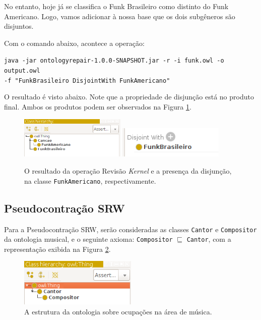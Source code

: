 No entanto, hoje já se classifica o Funk Brasileiro como distinto do Funk Americano. Logo, vamos adicionar à nossa base que os dois subgêneros são disjuntos.

Com o comando abaixo, acontece a operação:

\begin{small}
	\texttt{java -jar ontologyrepair-1.0.0-SNAPSHOT.jar -r -i funk.owl -o output.owl \\ -f "FunkBrasileiro DisjointWith FunkAmericano"}
\end{small}

O resultado é visto abaixo. Note que a propriedade de disjunção está no produto final. Ambos os produtos podem ser observados na Figura \ref{img:r2}.

\begin{figure}[H]
	\centering
	\includegraphics[width=0.45\textwidth]{Capitulos/Implementacao/r2.png}
	\includegraphics[width=0.45\textwidth]{Capitulos/Implementacao/r3.png}
	\caption{O resultado da operação Revisão \textit{Kernel} e a presença da disjunção, na classe \texttt{FunkAmericano}, respectivamente.}
	\label{img:r2}
\end{figure}

\subsection{Pseudocontração SRW}

Para a Pseudocontração SRW, serão consideradas as classes \texttt{Cantor} e \texttt{Compositor} da ontologia musical, e o seguinte axioma: \texttt{Compositor} $ \sqsubseteq $ \texttt{Cantor}, com a representação exibida na Figura \ref{img:srw1}.

\begin{figure}[H]
	\centering
	\includegraphics[width=0.5\textwidth]{Capitulos/Implementacao/srw1.png}
	\caption{A estrutura da ontologia sobre ocupações na área de música.}
	\label{img:srw1}
\end{figure}

